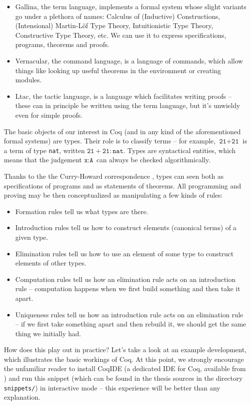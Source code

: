 \documentclass[declaration,inz,english,shortabstract]{iithesis}
\newcommand{\m}[1]{\texttt{#1}}
\begin{document}
\begin{itemize}
    \item Gallina, the term language, implements a formal system whose slight variants go under a plethora of names: Calculus of (Inductive) Constructions, (Intensional) Martin-L\"of Type Theory, Intuitionistic Type Theory, Constructive Type Theory, etc. We can use it to express specifications, programs, theorems and proofs.
    \item Vernacular, the command language, is a language of commands, which allow things like looking up useful theorems in the environment or creating modules.
    \item Ltac, the tactic language, is a language which facilitates writing proofs -- these can in principle be written using the term language, but it's unwieldy even for simple proofs.
\end{itemize}

The basic objects of our interest in Coq (and in any kind of the aforementioned formal systems) are types. Their role is to classify terms -- for example, $\m{21} + \m{21}$ is a term of type \m{nat}, written $\m{21} + \m{21} : \m{nat}$. Types are syntactical entities, which means that the judgement $\m{x} : \m{A}$ can always be checked algorithmically.

Thanks to the the Curry-Howard correspondence \cite{CurryHoward}, types can seen both as specifications of programs and as statements of theorems. All programming and proving may be then conceptualized as manipulating a few kinds of rules:

\begin{itemize}
    \item Formation rules tell us what types are there.
    \item Introduction rules tell us how to construct elements (canonical terms) of a given type.
    \item Elimination rules tell us how to use an element of some type to construct elements of other types.
    \item Computation rules tell us how an elimination rule acts on an introduction rule -- computation happens when we first build something and then take it apart.
    \item Uniqueness rules tell us how an introduction rule acts on an elimination rule -- if we first take something apart and then rebuild it, we should get the same thing we initially had.
\end{itemize}

How does this play out in practice? Let's take a look at an example development, which illustrates the basic workings of Coq. At this point, we strongly encourage the unfamiliar reader to install CoqIDE (a dedicated IDE for Coq, available from \cite{Coq}) and run this snippet (which can be found in the thesis sources in the directory \m{snippets/}) in interactive mode -- this experience will be better than any explanation.
\end{document}
